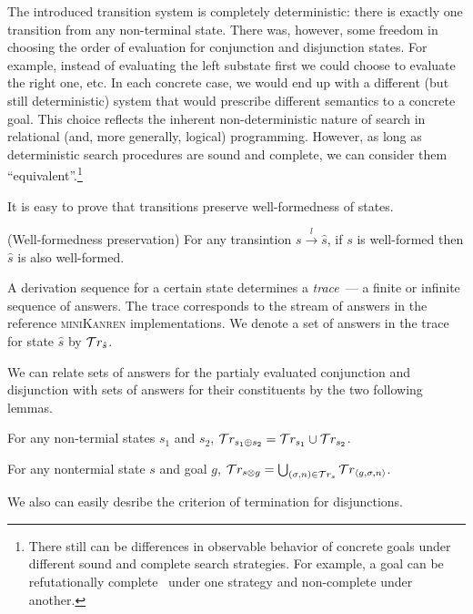 The introduced transition system is completely deterministic: there is exactly one transition from any non-terminal state.
There was, however, some freedom in choosing the order of evaluation for conjunction and
disjunction states. For example, instead of evaluating the left substate first we could choose to evaluate the right one, etc. In each concrete case, we would
end up with a different (but still deterministic) system that would prescribe different semantics to a concrete goal. This choice reflects the inherent
non-deterministic nature of search in relational (and, more generally, logical) programming. However, as long as deterministic search procedures
are sound and complete, we can consider them ``equivalent''.\footnote{There still can be differences in observable behavior of concrete goals under different
sound and complete search strategies. For example, a goal can be refutationally complete~\cite{WillThesis} under one strategy and non-complete under another.}

It is easy to prove that transitions preserve well-formedness of states.

\begin{lemma}{(Well-formedness preservation)}
\label{lem:well_formedness_preservation}
For any transintion $s \xrightarrow{l} \hat{s}$, if $s$ is well-formed then $\hat{s}$ is also well-formed.
\end{lemma}

A derivation sequence for a certain state determines a \emph{trace}~--- a finite or infinite sequence of answers. The trace corresponds to the stream of answers
in the reference \textsc{miniKanren} implementations. We denote a set of answers in the trace for state $\hat{s}$ by $\mathcal{T}r_{\hat{s}}$.

We can relate sets of answers for the partialy evaluated conjunction and disjunction with sets of answers for their constituents by the two following lemmas.

\begin{lemma}
\label{lem:sum_answers}
For any non-termial states $s_1$ and $s_2$, $\mathcal{T}r_{s_1 \oplus s_2} = \mathcal{T}r_{s_1} \cup \mathcal{T}r_{s_2}$.
\end{lemma}

\begin{lemma}
\label{lem:prod_answers}
For any nontermial state $s$ and goal $g$,  \mbox{$\mathcal{T}r_{s \otimes g} = \bigcup_{(\sigma, n) \in \mathcal{T}r_{s}} \mathcal{T}r_{\left<{g, \sigma, n}\right>}$}.
\end{lemma}

We also can easily desribe the criterion of termination for disjunctions.

